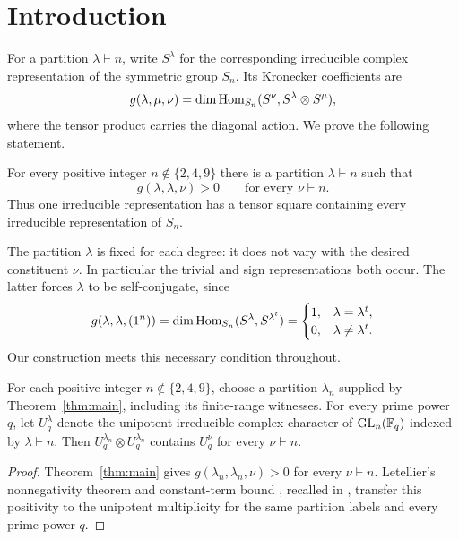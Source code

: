 \section{Introduction}
\label{sec:introduction}

For a partition $\lambda\vdash n$, write $S^\lambda$ for the corresponding
irreducible complex representation of the symmetric group $S_n$. Its
Kronecker coefficients are
\[
 g(\lambda,\mu,\nu)
 =\dim\operatorname{Hom}_{S_n}(S^\nu,S^\lambda\otimes S^\mu),
\]
where the tensor product carries the diagonal action. We prove the
following statement.

\begin{theorem}\label{thm:main}
For every positive integer $n\notin\{2,4,9\}$ there is a partition
$\lambda\vdash n$ such that
\[
 g(\lambda,\lambda,\nu)>0\qquad\text{for every }\nu\vdash n.
\]
Thus one irreducible representation has a tensor square containing every
irreducible representation of $S_n$.
\end{theorem}

The partition $\lambda$ is fixed for each degree: it does not vary with
the desired constituent $\nu$. In particular the trivial and sign
representations both occur. The latter forces $\lambda$ to be
self-conjugate, since
\[
 g(\lambda,\lambda,(1^n))
 =\dim\operatorname{Hom}_{S_n}(S^\lambda,S^{\lambda^t})
 =\begin{cases}1,&\lambda=\lambda^t,\\0,&\lambda\ne\lambda^t.
 \end{cases}
\]
Our construction meets this necessary condition throughout.

\begin{corollary}\label{cor:unipotent-squares}
For each positive integer $n\notin\{2,4,9\}$, choose a partition
$\lambda_n$ supplied by Theorem~\ref{thm:main}, including its
finite-range witnesses. For every prime power $q$, let $U_q^\lambda$
denote the unipotent irreducible complex character of $\operatorname{GL}_n(\mathbb F_q)$
indexed by $\lambda\vdash n$. Then
$U_q^{\lambda_n}\otimes U_q^{\lambda_n}$ contains $U_q^\nu$
for every $\nu\vdash n$.
\end{corollary}

\begin{proof}
Theorem~\ref{thm:main} gives $g(\lambda_n,\lambda_n,\nu)>0$ for every
$\nu\vdash n$. Letellier's nonnegativity theorem and constant-term bound
\cite[Theorem~4 and Proposition~6]{Letellier}, recalled in
\cite[Theorem~2.8]{LetellierNam}, transfer this positivity to the
unipotent multiplicity for the same partition labels and every prime
power $q$.
\end{proof}


